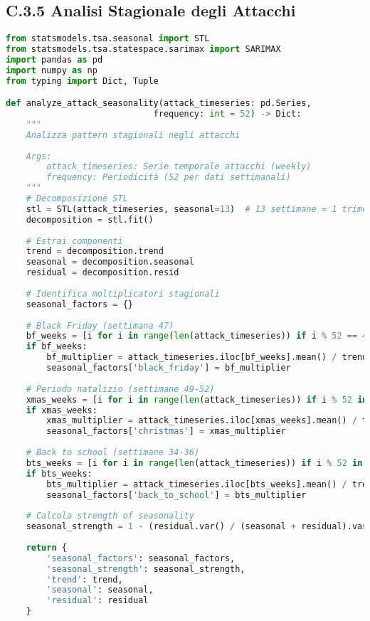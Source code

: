 \subsection{C.3.5 Analisi Stagionale degli Attacchi}

\begin{lstlisting}[language=Python, caption=Decomposizione Stagionale Pattern Attacchi]
from statsmodels.tsa.seasonal import STL
from statsmodels.tsa.statespace.sarimax import SARIMAX
import pandas as pd
import numpy as np
from typing import Dict, Tuple

def analyze_attack_seasonality(attack_timeseries: pd.Series, 
                             frequency: int = 52) -> Dict:
    """
    Analizza pattern stagionali negli attacchi
    
    Args:
        attack_timeseries: Serie temporale attacchi (weekly)
        frequency: Periodicità (52 per dati settimanali)
    """
    # Decomposizione STL
    stl = STL(attack_timeseries, seasonal=13)  # 13 settimane = 1 trimestre
    decomposition = stl.fit()
    
    # Estrai componenti
    trend = decomposition.trend
    seasonal = decomposition.seasonal
    residual = decomposition.resid
    
    # Identifica moltiplicatori stagionali
    seasonal_factors = {}
    
    # Black Friday (settimana 47)
    bf_weeks = [i for i in range(len(attack_timeseries)) if i % 52 == 47]
    if bf_weeks:
        bf_multiplier = attack_timeseries.iloc[bf_weeks].mean() / trend.iloc[bf_weeks].mean()
        seasonal_factors['black_friday'] = bf_multiplier
    
    # Periodo natalizio (settimane 49-52)
    xmas_weeks = [i for i in range(len(attack_timeseries)) if i % 52 in range(49, 53)]
    if xmas_weeks:
        xmas_multiplier = attack_timeseries.iloc[xmas_weeks].mean() / trend.iloc[xmas_weeks].mean()
        seasonal_factors['christmas'] = xmas_multiplier
    
    # Back to school (settimane 34-36)
    bts_weeks = [i for i in range(len(attack_timeseries)) if i % 52 in range(34, 37)]
    if bts_weeks:
        bts_multiplier = attack_timeseries.iloc[bts_weeks].mean() / trend.iloc[bts_weeks].mean()
        seasonal_factors['back_to_school'] = bts_multiplier
    
    # Calcola strength of seasonality
    seasonal_strength = 1 - (residual.var() / (seasonal + residual).var())
    
    return {
        'seasonal_factors': seasonal_factors,
        'seasonal_strength': seasonal_strength,
        'trend': trend,
        'seasonal': seasonal,
        'residual': residual
    }


\end{lstlisting}
